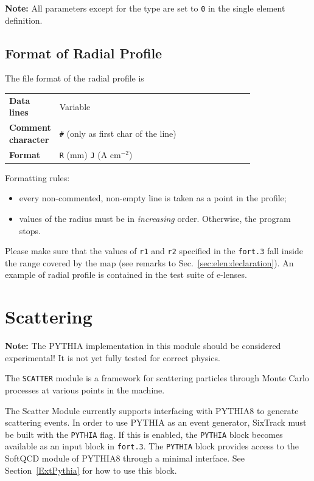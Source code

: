 \bigskip
\noindent \textbf{Note:} All parameters except for the type are set to \texttt{0} in the single element definition.

\subsection{Format of Radial Profile} \label{sec:elen_rad_prof}
The file format of the radial profile is

\bigskip
\begin{tabular}{@{}lp{0.8\linewidth}}
    \textbf{Data lines} & Variable \\
    \textbf{Comment character} & \texttt{\#} (only as first char of the line) \\
    \textbf{Format}     & \texttt{R} (mm) \texttt{J} (A cm$^{-2}$) \\
\end{tabular}

\bigskip
\noindent Formatting rules:
\begin{itemize}
\item every non-commented, non-empty line is taken as a point in the profile;
\item values of the radius must be in \emph{increasing} order. Otherwise, the program stops.
\end{itemize}

\noindent Please make sure that the values of \texttt{r1} and \texttt{r2} specified in the \texttt{fort.3} fall inside the range covered by the map (see remarks to Sec.~\ref{sec:elen:declaration}). An example of radial profile is contained in the test suite of e-lenses.

\section{Scattering} \label{sec:scatter}

\textcolor{notered}{\textbf{Note:} The PYTHIA implementation in this module should be considered experimental! It is not yet fully tested for correct physics.}

The \texttt{SCATTER} module is a framework for scattering particles through Monte Carlo processes at various points in the machine.

The Scatter Module currently supports interfacing with PYTHIA8 to generate scattering events.
In order to use PYTHIA as an event generator, SixTrack must be built with the \texttt{PYTHIA} flag.
If this is enabled, the \texttt{PYTHIA} block becomes available as an input block in \texttt{fort.3}.
The \texttt{PYTHIA} block provides access to the SoftQCD module of PYTHIA8 through a minimal interface.
See Section~\ref{ExtPythia} for how to use this block.


